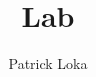\documentclass[11pt]{scrartcl}
\theoremstyle{plain} %
\theoremstyle{definition} %
\begin{document}
	\title{Lab}
	\author{Patrick Loka}
	\maketitle
	\tableofcontents
	\newpage
	
	{ %
	}
	{ %
		\listofcomments\label{list_of_comments}
		\newpage
	}
	
	\newpage
	
\end{document}
